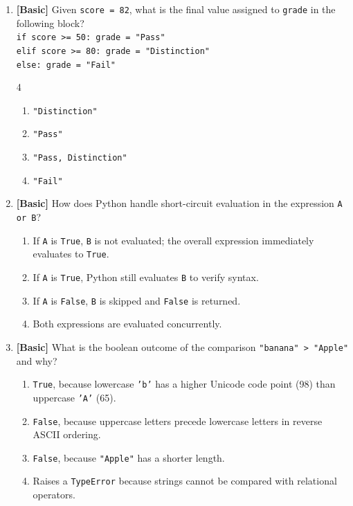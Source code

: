\documentclass[11pt,a4paper]{article}
\begin{document}
\begin{enumerate}[label=\textbf{Q\arabic*.},leftmargin=1.8em,itemsep=0.7pt,topsep=0.3pt,resume]
\item \textbf{[Basic]} Given \texttt{score = 82}, what is the final value assigned to \texttt{grade} in the following block?\\
\texttt{if score >= 50: grade = "Pass"}\\
\texttt{elif score >= 80: grade = "Distinction"}\\
\texttt{else: grade = "Fail"}
\begin{multicols}{4}
\begin{enumerate}[label=\Alph*.]
  \item \texttt{"Distinction"}
  \item \texttt{"Pass"}
  \item \texttt{"Pass, Distinction"}
  \item \texttt{"Fail"}
\end{enumerate}
\end{multicols}

\item \textbf{[Basic]} How does Python handle short-circuit evaluation in the expression \texttt{A or B}?
\begin{enumerate}[label=\Alph*.,leftmargin=1.8em]
  \item If \texttt{A} is \texttt{True}, \texttt{B} is not evaluated; the overall expression immediately evaluates to \texttt{True}.
  \item If \texttt{A} is \texttt{True}, Python still evaluates \texttt{B} to verify syntax.
  \item If \texttt{A} is \texttt{False}, \texttt{B} is skipped and \texttt{False} is returned.
  \item Both expressions are evaluated concurrently.
\end{enumerate}

\item \textbf{[Basic]} What is the boolean outcome of the comparison \texttt{"banana" > "Apple"} and why?
\begin{enumerate}[label=\Alph*.,leftmargin=1.8em]
  \item \texttt{True}, because lowercase \texttt{'b'} has a higher Unicode code point (98) than uppercase \texttt{'A'} (65).
  \item \texttt{False}, because uppercase letters precede lowercase letters in reverse ASCII ordering.
  \item \texttt{False}, because \texttt{"Apple"} has a shorter length.
  \item Raises a \texttt{TypeError} because strings cannot be compared with relational operators.
\end{enumerate}


\end{enumerate}
\end{document}
